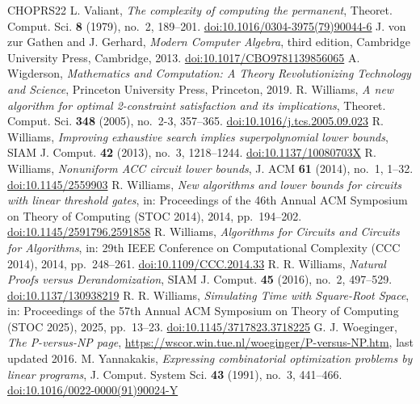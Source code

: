 \documentclass[11pt,reqno]{amsart}
\numberwithin{equation}{section}
\theoremstyle{plain}
\theoremstyle{definition}
\theoremstyle{remark}
\begin{document}
\begin{thebibliography}{CHOPRS22}
 L. Valiant, \emph{The complexity of computing the permanent}, Theoret. Comput. Sci. \textbf{8} (1979), no.~2, 189--201. \href{https://doi.org/10.1016/0304-3975(79)90044-6}{doi:10.1016/0304-3975(79)90044-6}
 J. von zur Gathen and J. Gerhard, \emph{Modern Computer Algebra}, third edition, Cambridge University Press, Cambridge, 2013. \href{https://doi.org/10.1017/CBO9781139856065}{doi:10.1017/CBO9781139856065}
 A. Wigderson, \emph{Mathematics and Computation: A Theory Revolutionizing Technology and Science}, Princeton University Press, Princeton, 2019.
 R. Williams, \emph{A new algorithm for optimal 2-constraint satisfaction and its implications}, Theoret. Comput. Sci. \textbf{348} (2005), no.~2-3, 357--365. \href{https://doi.org/10.1016/j.tcs.2005.09.023}{doi:10.1016/j.tcs.2005.09.023}
 R. Williams, \emph{Improving exhaustive search implies superpolynomial lower bounds}, SIAM J. Comput. \textbf{42} (2013), no.~3, 1218--1244. \href{https://doi.org/10.1137/10080703X}{doi:10.1137/10080703X}
 R. Williams, \emph{Nonuniform ACC circuit lower bounds}, J. ACM \textbf{61} (2014), no.~1, 1--32. \href{https://doi.org/10.1145/2559903}{doi:10.1145/2559903}
 R. Williams, \emph{New algorithms and lower bounds for circuits with linear threshold gates}, in: Proceedings of the 46th Annual ACM Symposium on Theory of Computing (STOC 2014), 2014, pp.~194--202. \href{https://doi.org/10.1145/2591796.2591858}{doi:10.1145/2591796.2591858}
 R. Williams, \emph{Algorithms for Circuits and Circuits for Algorithms}, in: 29th IEEE Conference on Computational Complexity (CCC 2014), 2014, pp.~248--261. \href{https://doi.org/10.1109/CCC.2014.33}{doi:10.1109/CCC.2014.33}
 R. R. Williams, \emph{Natural Proofs versus Derandomization}, SIAM J. Comput. \textbf{45} (2016), no.~2, 497--529. \href{https://doi.org/10.1137/130938219}{doi:10.1137/130938219}
 R. R. Williams, \emph{Simulating Time with Square-Root Space}, in: Proceedings of the 57th Annual ACM Symposium on Theory of Computing (STOC 2025), 2025, pp.~13--23. \href{https://doi.org/10.1145/3717823.3718225}{doi:10.1145/3717823.3718225}
 G. J. Woeginger, \emph{The P-versus-NP page}, \url{https://wscor.win.tue.nl/woeginger/P-versus-NP.htm}, last updated 2016.
 M. Yannakakis, \emph{Expressing combinatorial optimization problems by linear programs}, J. Comput. System Sci. \textbf{43} (1991), no.~3, 441--466. \href{https://doi.org/10.1016/0022-0000(91)90024-Y}{doi:10.1016/0022-0000(91)90024-Y}

\end{thebibliography}
\end{document}
